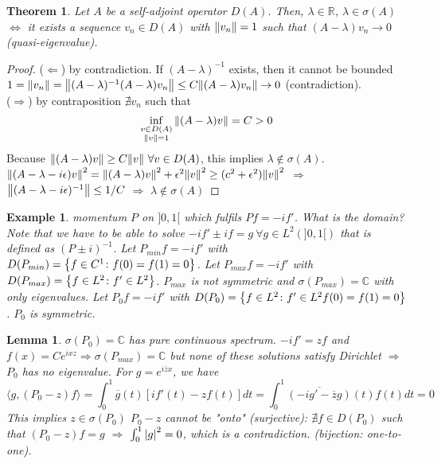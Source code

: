 \documentclass{article}
\newtheorem*{theorem}{Theorem}
\newtheorem*{lemma}{Lemma}
\newtheorem*{example}{Example}
\newcommand{\RR}{\mathbb{R}}
\newcommand{\CC}{\mathbb{C}}
\newcommand{\eps}{\epsilon}
\newcommand{\sig}{\sigma}
\newcommand{\la}{\lambda}
\renewcommand{\sp}[2]{\langle #1,#2 \rangle}
\begin{document}
\begin{theorem}
  Let $A$ be a self-adjoint operator $D(A)$. 
  Then, $\la \in \RR$, $\la \in \sig(A)$ $\Leftrightarrow$ it exists a sequence $v_n \in D(A)$ with $\norm{v_n} = 1$ such that $(A - \la) v_n \to 0$ (quasi-eigenvalue).
\end{theorem}

\begin{proof} 
  ($\Leftarrow$) by contradiction. If $(A - \la)^{-1}$ exists, then it cannot be bounded 
  $1 = \norm{v_n} = \norm{(A - \la)^{-1} (A - \la) v_n} \le C \norm{(A - \la) v_n} \to 0$ (contradiction).
  \\
  ($\Rightarrow$) by contraposition
  $\nexists v_n$ such that 
  $$\inf_{\substack{v\in D(A) \\ \norm{v} = 1}} \norm{(A - \la)v} = C > 0$$
  Because $\norm{(A - \la) v} \ge C \norm{v} \ \forall v \in D(A)$, this implies $\la \notin \sig(A)$.
  $\norm{(A - \la - i \eps)v}^2 = \norm{(A - \la)v}^2 + \eps^2 \norm{v}^2 \ge (c^2 +\eps^2) \norm{v}^2$ 
  $\Rightarrow$ $\norm{(A - \la - i \eps)^{-1}} \le 1/C$ 
  $\Rightarrow$ $\la \notin \sig(A)$
\end{proof} 

\begin{example} 
  momentum $P$ on $]0,1[$ which fulfils $P f = - i f'$.
  What is the domain? 
  Note that we have to be able to solve $-i f' \pm i f = g \ \forall g \in L^2(]0,1[)$ that is defined as $(P \pm i)^{-1}$.
  Let $P_{min} f = - i f'$ with $D(P_{min}) = \qty{ f \in C^1 \colon f(0) = f(1) = 0 }$.
  Let $P_{max} f = - i f'$ with $D(P_{max}) = \qty{ f \in L^2 \colon f' \in L^2 }$.
  $P_{max}$ is not symmetric and $\sig(P_{max}) = \CC$ with only eigenvalues.
  Let $P_0 f = - i f'$ with  $D(P_0) = \qty{ f \in L^2 \colon f' \in L^2 f(0) = f(1) = 0 }$.
  $P_0$ is symmetric.
\end{example} 

\begin{lemma} 
  $\sig(P_0) = \CC$ has pure continuous spectrum.
  $- i f' = z f$ and $f(x) = C e^{ixz} \Rightarrow \sig(P_{max}) = \CC$ 
  but none of these solutions satisfy Dirichlet $\Rightarrow$ $P_0$ has no eigenvalue.
  For $g = e^{i\overline{z}x}$, we have 
  $$ \sp{g}{(P_0 - z)f} = \int_0^1 \overline{g}(t) [i f'(t) - z f(t)] dt = \int_0^1 \overline{(-i g'-\overline{z} g)}(t) f(t) dt = 0$$
  This implies $z \in \sig(P_0)$ 
  $P_0 - z$ cannot be "onto" (surjective): $\nexists f \in D(P_0)$ such that $(P_0 - z) f = g$ $\Rightarrow$ $\int_0^1 \abs{g}^2 = 0$, which is a contradiction.
  (bijection: one-to-one).
\end{lemma}
\end{document}
